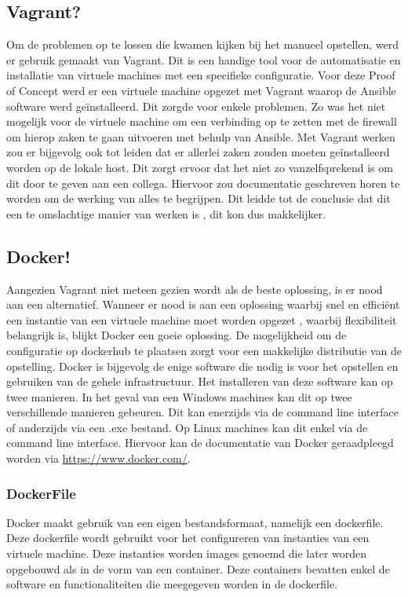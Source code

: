 \subsection{Vagrant?}
Om de problemen op te lossen die kwamen kijken bij het manueel opstellen, werd er gebruik gemaakt van Vagrant. Dit is een handige tool voor de automatisatie en installatie van virtuele machines met een specifieke configuratie. Voor deze Proof of Concept werd er een virtuele machine opgezet met Vagrant waarop de Ansible software werd geïnstalleerd. Dit zorgde voor enkele problemen. 
\newline
\newline
Zo was het niet mogelijk voor de virtuele machine om een verbinding op te zetten met de firewall om hierop zaken te gaan uitvoeren met behulp van Ansible. Met Vagrant werken zou er bijgevolg ook tot leiden dat er allerlei zaken zouden moeten geïnstalleerd worden op de lokale host. Dit zorgt ervoor dat het niet zo vanzelfsprekend is om dit door te geven aan een collega. Hiervoor zou documentatie geschreven horen te worden om de werking van alles te begrijpen. Dit leidde tot de conclusie dat dit een te omslachtige manier van werken is , dit kon dus makkelijker. 
\newpage

\subsection{Docker!}
Aangezien Vagrant niet meteen gezien wordt als de beste oplossing, is er nood aan een alternatief. Wanneer er nood is aan een oplossing waarbij snel en efficiënt een instantie van een virtuele machine moet worden opgezet , waarbij flexibiliteit belangrijk is, blijkt Docker een goeie oplossing. De mogelijkheid om de configuratie op dockerhub te plaatsen zorgt voor een makkelijke distributie van de opstelling. Docker is bijgevolg de enige software die nodig is voor het opstellen en gebruiken van de gehele infrastructuur. Het installeren van deze software kan op twee manieren. In het geval van een Windows machines kan dit op twee verschillende manieren gebeuren. Dit kan enerzijds via de command line interface of anderzijds via een .exe bestand. Op Linux machines kan dit enkel via de command line interface. Hiervoor kan de documentatie van Docker geraadpleegd worden via \url{ https://www.docker.com/}. \newline

\subsubsection{DockerFile}
Docker maakt gebruik van een eigen bestandsformaat, namelijk een dockerfile. Deze dockerfile wordt gebruikt voor het configureren van instanties van een virtuele machine. Deze instanties worden images genoemd die later worden opgebouwd als in de vorm van een container. Deze containers bevatten enkel de software en functionaliteiten die meegegeven worden in de dockerfile. \newline

